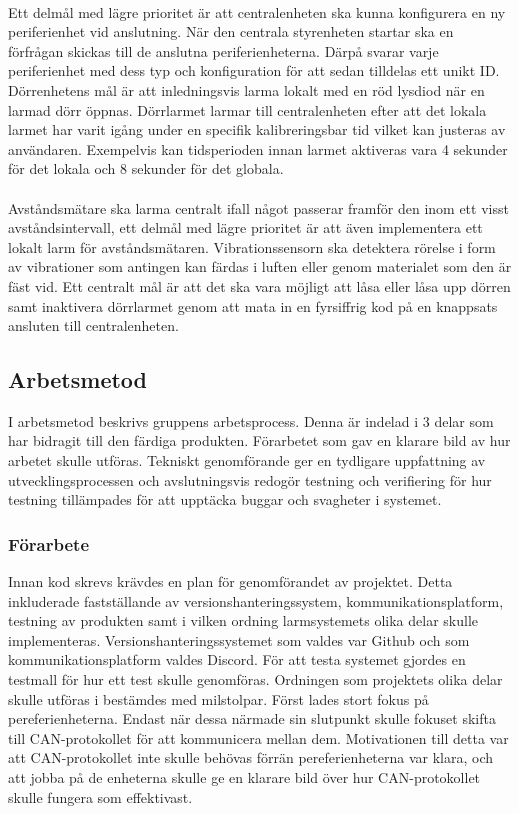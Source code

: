 \documentclass{article}
\begin{document}
\\
Ett delmål med lägre prioritet är att centralenheten ska kunna konfigurera en ny periferienhet vid anslutning. När den centrala styrenheten startar ska en förfrågan skickas till de anslutna periferienheterna.
Därpå svarar varje periferienhet med dess typ och konfiguration för att sedan tilldelas ett unikt ID.
Dörrenhetens mål är att inledningsvis larma lokalt med en röd lysdiod när en larmad dörr öppnas. 
Dörrlarmet larmar till centralenheten efter att det lokala larmet har varit igång under en specifik kalibreringsbar tid vilket kan justeras av användaren. 
Exempelvis kan tidsperioden innan larmet aktiveras vara 4 sekunder för det lokala och 8 sekunder för det globala.\\
\\
Avståndsmätare ska larma centralt ifall något passerar framför den inom ett visst avståndsintervall, ett delmål med lägre prioritet är att även implementera ett lokalt larm för avståndsmätaren.
Vibrationssensorn ska detektera rörelse i form av vibrationer som antingen kan färdas i luften eller genom materialet som den är fäst vid.
Ett centralt mål är att det ska vara möjligt att låsa eller låsa upp dörren samt inaktivera dörrlarmet genom att mata in en fyrsiffrig kod på en knappsats ansluten till centralenheten.

\subsection{Arbetsmetod}
I arbetsmetod beskrivs gruppens arbetsprocess. Denna är indelad i 3 delar som har bidragit till den färdiga produkten. Förarbetet som gav en klarare bild av hur arbetet skulle utföras. Tekniskt genomförande ger en tydligare uppfattning av utvecklingsprocessen och avslutningsvis redogör testning och verifiering för hur testning tillämpades för att upptäcka buggar och svagheter i systemet.

\subsubsection{Förarbete}
Innan kod skrevs krävdes en plan för genomförandet av projektet.
Detta inkluderade fastställande av versionshanteringssystem, kommunikationsplatform, testning av produkten samt i vilken ordning larmsystemets olika delar skulle implementeras.
Versionshanteringssystemet som valdes var Github och som kommunikationsplatform valdes Discord.
För att testa systemet gjordes en testmall för hur ett test skulle genomföras. 
Ordningen som projektets olika delar skulle utföras i bestämdes med milstolpar. Först lades stort fokus på pereferienheterna. 
Endast när dessa närmade sin slutpunkt skulle fokuset skifta till CAN-protokollet för att kommunicera mellan dem. 
Motivationen till detta var att CAN-protokollet inte skulle behövas förrän pereferienheterna var klara, och att jobba på de enheterna skulle ge en klarare bild över hur CAN-protokollet skulle fungera som effektivast.
\end{document}
